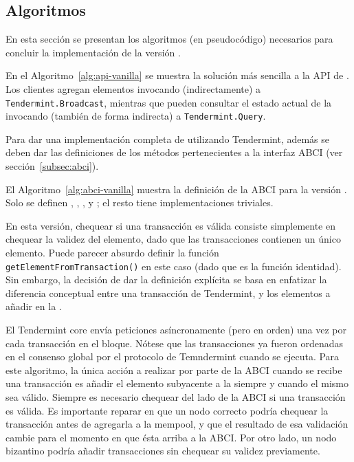 \subsection{Algoritmos}

En esta sección se presentan los algoritmos (en pseudocódigo) necesarios para concluir
la implementación de la versión \vanilla.
%


En el Algoritmo~\ref{alg:api-vanilla} se muestra la solución más sencilla a la API
de \setchain.
%
Los clientes agregan elementos invocando (indirectamente) a
\texttt{Tendermint.Broadcast}, mientras que pueden consultar el estado actual de
la \setchain invocando (también de forma indirecta) a \texttt{Tendermint.Query}.
%

Para dar una implementación completa de \setchain utilizando Tendermint, además se
deben dar las definiciones de los métodos pertenecientes a la interfaz ABCI
(ver sección~\ref{subsec:abci}). 
%


El Algoritmo~\ref{alg:abci-vanilla} muestra la definición de la ABCI para la versión
\vanilla.
%
Solo se definen \CheckTx, \DeliverTx, \EndBlock, y \Query; el resto tiene implementaciones
triviales.

En esta versión, chequear si una transacción es válida consiste simplemente en chequear
la validez del elemento, dado que las transacciones contienen un único elemento.
%
Puede parecer absurdo definir la función \texttt{getElementFromTransaction()}
en este caso (dado que es la función identidad). Sin embargo, la decisión de dar
la definición explícita se basa en enfatizar la diferencia conceptual entre una
transacción de Tendermint, y los elementos a añadir en la \setchain.
%

El Tendermint core envía peticiones \DeliverTx asíncronamente (pero en orden)
una vez por cada transacción en el bloque.
%
Nótese que las transacciones ya fueron ordenadas en el consenso global por el protocolo
de Temndermint cuando \DeliverTx se ejecuta.
%
Para este algoritmo, la única acción a realizar por parte de la ABCI cuando se recibe una
transacción es añadir el elemento subyacente a la \setchain siempre y cuando el mismo
sea válido.
%
Siempre es necesario chequear del lado de la ABCI si una transacción es válida.
%
Es importante reparar en que un nodo correcto podría chequear la transacción antes de agregarla a la
mempool,
y que el resultado de esa validación cambie para el momento en que ésta arriba a la
ABCI.
%
Por otro lado, un nodo bizantino podría añadir transacciones sin chequear
su validez previamente.
%

